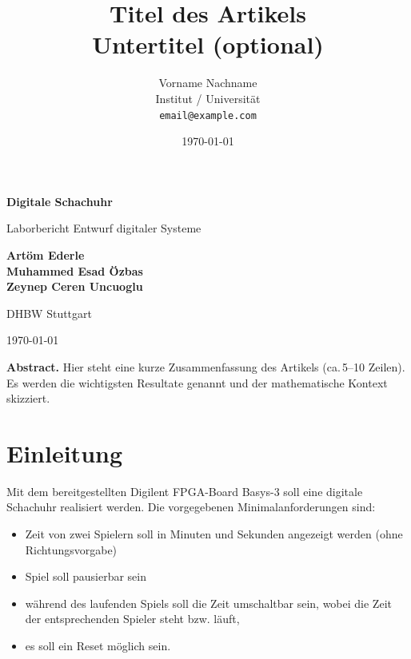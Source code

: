 \documentclass[12pt, a4paper]{article}
\title{\textbf{Titel des Artikels}\\[0.5em]
       \large Untertitel (optional)}
\author{Vorname Nachname\\[0.3em]
        \small Institut / Universität\\
        \small \texttt{email@example.com}}
\date{\today}
\theoremstyle{plain}
\theoremstyle{definition}
\theoremstyle{remark}
\begin{document}
\begin{titlepage}
  \centering
  \vspace*{3cm}

  {\LARGE\bfseries Digitale Schachuhr\par}
  \vspace{0.5em}
  {\large Laborbericht Entwurf digitaler Systeme\par}

  \vspace{2.5cm}

  {\large\bfseries Artöm Ederle\\Muhammed Esad Özbas\\Zeynep Ceren Uncuoglu\par}
  \vspace{0.5em}
  {\normalsize DHBW Stuttgart\\[0.3em]\par}

  \vfill

  {\normalsize \today\par}

  \vspace{1.5cm}

  \begin{minipage}{0.85\textwidth}
    \small
    \textbf{Abstract.}
    Hier steht eine kurze Zusammenfassung des Artikels (ca.\,5–10 Zeilen).
    Es werden die wichtigsten Resultate genannt und der
    mathematische Kontext skizziert.
  \end{minipage}

  \vspace{1cm}

\end{titlepage}

\setcounter{page}{1}

\section{Einleitung}
Mit dem bereitgestellten Digilent FPGA-Board Basys-3 soll eine digitale Schachuhr realisiert werden. Die vorgegebenen Minimalanforderungen sind:
\begin{itemize}
    \item Zeit von zwei Spielern soll in Minuten und Sekunden angezeigt werden (ohne Richtungsvorgabe)
    \item Spiel soll pausierbar sein
    \item während des laufenden Spiels soll die Zeit umschaltbar sein, wobei die Zeit der entsprechenden Spieler steht bzw. läuft,
    \item es soll ein Reset möglich sein.
\end{itemize}
\end{document}
